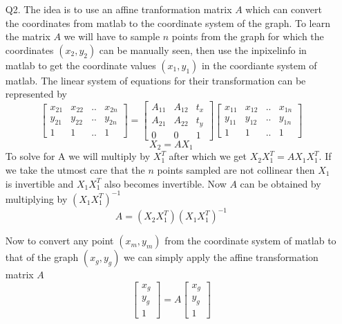 \documentclass[11pt]{article}
\begin{document}
\maketitle

\begin{enumerate}
\item[Q2. ] The idea is to use an affine tranformation matrix $A$ which can convert the coordinates from matlab to the coordinate system of the graph. To learn the matrix $A$ we will have to sample $n$ points from the graph for which the coordinates $(x_{2}, y_{2})$ can be manually seen, then use the inpixelinfo in matlab to get the coordinate values $(x_{1}, y_{1})$ in the coordiante system of matlab. The linear system of equations for their transformation can be represented by
$$
\begin{bmatrix}
    x_{21} & x_{22} &.. & x_{2n} \\
    y_{21} & y_{22} &.. & y_{2n} \\
    1 & 1 &.. & 1
\end{bmatrix} = 
\begin{bmatrix}
    A_{11} & A_{12} & t_{x} \\
    A_{21} & A_{22} & t_{y} \\
    0 & 0 & 1
\end{bmatrix}
\begin{bmatrix}
    x_{11} & x_{12} &.. & x_{1n} \\
    y_{11} & y_{12} &.. & y_{1n} \\
    1 & 1 &.. & 1
\end{bmatrix}
$$
$$X_{2} = AX_{1}$$
To solve for A we will multiply by $X_{1}^{T}$ after which we get $X_{2}X_{1}^{T} = AX_{1}X_{1}^{T}$. If we take the utmost care that the $n$ points sampled are not collinear then $X_{1}$ is invertible and $X_{1}X_{1}^{T}$ also becomes invertible. Now $A$ can be obtained by multiplying by $(X_{1}X_{1}^{T})^{-1}$
$$A = (X_{2}X_{1}^{T})(X_{1}X_{1}^{T})^{-1}$$

Now to convert any point $(x_{m}, y_{m})$ from the coordinate system of matlab to that of the graph $(x_{g}, y_{g})$ we can simply apply the affine transformation matrix $A$
$$
\begin{bmatrix}
    x_{g} \\
    y_{g} \\
    1
\end{bmatrix} = 
A
\begin{bmatrix}
    x_{g} \\
    y_{g} \\
    1
\end{bmatrix}
$$

\end{enumerate}
\end{document}
